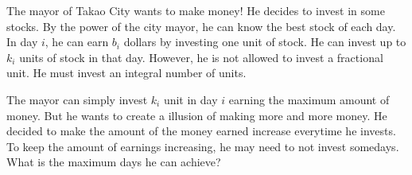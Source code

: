 The mayor of Takao City wants to make money! He decides to invest in some stocks. 
By the power of the city mayor, he can know the best stock of each day. 
In day $i$, he can earn $b_i$ dollars by investing one unit of stock. 
He can invest up to $k_i$ units of stock in that day.
However, he is not allowed to invest a fractional unit.
He must invest an integral number of units.

The mayor can simply invest $k_i$ unit in day $i$ earning the maximum amount of money. 
But he wants to create a illusion of making more and more money. 
He decided to make the amount of the money earned increase everytime he invests. 
To keep the amount of earnings increasing, he may need to not invest somedays. 
What is the maximum days he can achieve?
